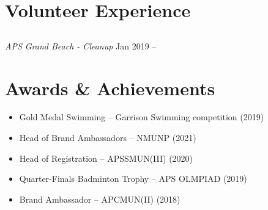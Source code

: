 \documentclass[letterpaper,11pt]{article}
\begin{document}
  \section{Volunteer Experience}
  
\subsection*{}
\textit{APS Grand Beach - Cleanup} \hfill Jan 2019 -- 




  \section{Awards \& Achievements}
  \begin{itemize}[leftmargin=*]
    \item Gold Medal Swimming – Garrison Swimming competition (2019)
  \item Head of Brand Ambassadors – NMUNP (2021)
  \item Head of Registration – APSSMUN(III) (2020)
  \item Quarter-Finals Badminton Trophy – APS OLMPIAD (2019)
  \item Brand Ambassador – APCMUN(II) (2018)
  \end{itemize}
  
  
\end{document}

